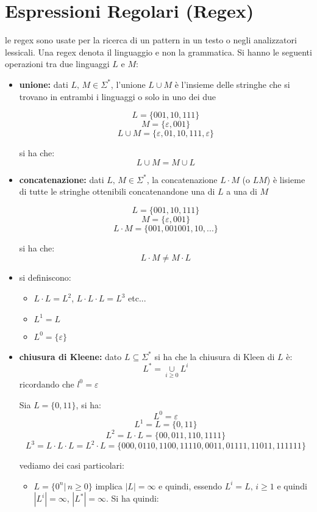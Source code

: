 \documentclass[a4paper,12pt, oneside]{book}
\begin{document}
\section{Espressioni Regolari (Regex)}
le regex sono usate per la ricerca di un pattern in un testo o negli analizzatori lessicali. Una regex denota il linguaggio e non la grammatica. Si hanno le seguenti operazioni tra due linguaggi $L$ e $M$:
\begin{itemize}
	\item \textbf{unione:} dati $L,\, M\in \Sigma^*$, l'unione $L\cup M$ è l'insieme delle stringhe che si trovano in entrambi i linguaggi o solo in uno dei due
	      \begin{esempio}
		      $$L=\{001,10,111\}$$
		      $$M=\{\varepsilon,001\}$$
		      $$L\cup M=\{\varepsilon,01,10,111,\varepsilon\}$$
	      \end{esempio}
	      si ha che:
	      $$L\cup M=M\cup L$$
	\item \textbf{concatenazione:} dati $L,\, M\in \Sigma^*$, la concatenazione $L\cdot M$ (o $LM$) è lisieme di tutte le stringhe ottenibili concatenandone una di $L$ a una di $M$
	      \begin{esempio}
		      $$L=\{001,10,111\}$$
		      $$M=\{\varepsilon,001\}$$
		      $$L\cdot M=\{001,001001,10,...\}$$
	      \end{esempio}
	      si ha che:
	      $$L\cdot M\neq M\cdot L$$
	\item si definiscono:
	      \begin{itemize}
		      \item $L\cdot L=L^2$, $L\cdot L\cdot L=L^3$ etc...
		      \item $L^1=L$
		      \item $L^0=\{\varepsilon\}$
	      \end{itemize}
	\item \textbf{chiusura di Kleene:} dato $L\subseteq \Sigma^*$ si ha che la chiusura di Kleen di $L$ è:
	      $$L^*=\underset{i\geq 0}{\cup}L^i$$
	      ricordando che $l^0=\varepsilon$
	      \begin{esempio}
		      Sia $L=\{0,11\}$, si ha:
		      $$L^0=\varepsilon$$
		      $$L^1=L=\{0,11\}$$
		      $$L^2=L\cdot L=\{00,011,110,1111\}$$
		      $$L^3=L\cdot L\cdot L=L^2\cdot L=\{000,0110,1100,11110,0011,01111,11011,111111\}$$
	      \end{esempio}
	      vediamo dei casi particolari:
	      \begin{itemize}
		      \item $L=\{0^n|\,n\geq 0\}$ implica $|L|=\infty$ e quindi, essendo $L^i=L,\, i\geq 1$ e quindi $|L^i|=\infty$, $|L^*|=\infty$. Si ha quindi:

\end{itemize}
\end{itemize}
\end{document}
